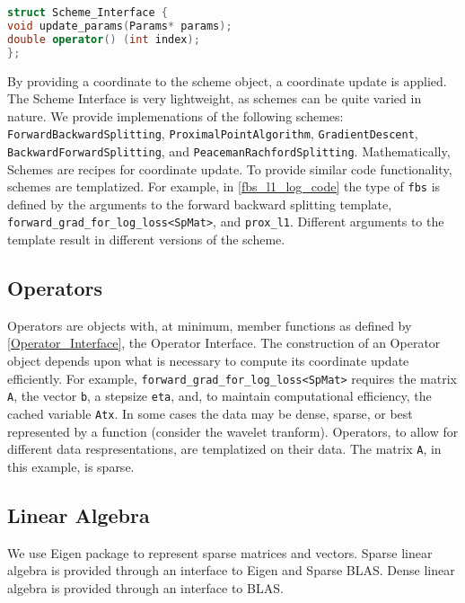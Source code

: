 \begin{lstlisting}[language=C++]
struct Scheme_Interface {
void update_params(Params* params);
double operator() (int index);
};
\end{lstlisting}
By providing a coordinate to the scheme object, a coordinate update is applied.
 The Scheme Interface is very lightweight, as schemes can be quite varied in nature.
 We provide implemenations of the following schemes: \texttt{ForwardBackwardSplitting}, \texttt{ProximalPointAlgorithm},  \texttt{GradientDescent}, \texttt{BackwardForwardSplitting}, and \hfill \break      \texttt{PeacemanRachfordSplitting}.
Mathematically, Schemes are recipes for coordinate update.
To provide similar code functionality, schemes are templatized.  
For example, in \ref{fbs_l1_log_code} the type of \texttt{fbs} is defined by the arguments to the forward backward splitting template, \texttt{forward\_grad\_for\_log\_loss<SpMat>}, and \texttt{prox\_l1}. 
Different arguments to the template result in different versions of the scheme. 

\subsection{Operators}

Operators are objects with, at minimum, member functions as defined by \ref{Operator_Interface}, the Operator Interface.
The construction of an Operator object depends upon what is necessary to compute its coordinate update efficiently.
For example, \texttt{forward\_grad\_for\_log\_loss<SpMat>} requires the matrix \texttt{A}, the vector \texttt{b}, a stepsize \texttt{eta},  and, to maintain computational efficiency, the cached variable \texttt{Atx}.
In some cases the data may be dense, sparse, or best represented by a function (consider the wavelet tranform).
Operators, to allow for different data respresentations, are templatized on their data.
The matrix \texttt{A}, in this example, is sparse.




\subsection{Linear Algebra}

We use Eigen package to represent sparse matrices and vectors. 
Sparse linear algebra is provided through an interface to Eigen and Sparse BLAS.
Dense linear algebra is provided through an interface to BLAS. 







